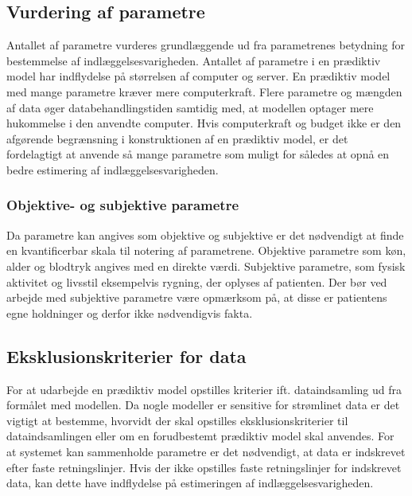 \subsection{Vurdering af parametre}
Antallet af parametre vurderes grundlæggende ud fra parametrenes betydning for bestemmelse af indlæggelsesvarigheden. Antallet af parametre i en prædiktiv model har indflydelse på størrelsen af computer og server. En prædiktiv model med mange parametre kræver mere computerkraft. Flere parametre og mængden af data øger databehandlingstiden samtidig med, at modellen optager mere hukommelse i den anvendte computer.\cite{Kuhn2013}
Hvis computerkraft og budget ikke er den afgørende begrænsning i konstruktionen af en prædiktiv model, er det fordelagtigt at anvende så mange parametre som muligt for således at opnå en bedre estimering af indlæggelsesvarigheden.


\subsubsection{Objektive- og subjektive parametre}
Da parametre kan angives som objektive og subjektive er det nødvendigt at finde en kvantificerbar skala til notering af parametrene. Objektive parametre som køn, alder og blodtryk angives med en direkte værdi. Subjektive parametre, som fysisk aktivitet og livsstil eksempelvis rygning, der oplyses af patienten. Der bør ved arbejde med subjektive parametre være opmærksom på, at disse er patientens egne holdninger og derfor ikke nødvendigvis fakta. 


\subsection{Eksklusionskriterier for data} 
For at udarbejde en prædiktiv model opstilles kriterier ift. dataindsamling ud fra formålet med modellen. Da nogle modeller er sensitive for strømlinet data er det vigtigt at bestemme, hvorvidt der skal opstilles eksklusionskriterier til dataindsamlingen eller om en forudbestemt prædiktiv model skal anvendes.\cite{Kuhn2013}
For at systemet kan sammenholde parametre er det nødvendigt, at data er indskrevet efter faste retningslinjer. Hvis der ikke opstilles faste retningslinjer for indskrevet data, kan dette have indflydelse på estimeringen af indlæggelsesvarigheden.\cite{Kuhn2013} 


